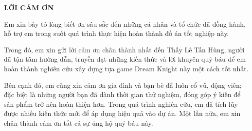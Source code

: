 \documentclass[../DoAn.tex]{subfiles}
\begin{document}
\begin{center}
    \Large{\textbf{LỜI CẢM ƠN}}\\
\end{center}
\vspace{1cm}

Em xin bày tỏ lòng biết ơn sâu sắc đến những cá nhân và tổ chức đã đồng hành, hỗ trợ em trong suốt quá trình thực hiện hoàn thành đồ án tốt nghiệp này. 

Trong đó, em xin gửi lời cảm ơn chân thành nhất đến Thầy Lê Tấn Hùng, người đã tận tâm hướng dẫn, truyền đạt những kiến thức và lời khuyên quý báu để em hoàn thành nghiên cứu xây dựng tựa game Dream Knight này một cách tốt nhất. 

Bên cạnh đó, em cũng xin cảm ơn gia đình và bạn bè đã luôn cổ vũ, động viên; đặc biệt là những người bạn đã dành thời gian thử nghiệm, đóng góp ý kiến để sản phẩm trở nên hoàn thiện hơn. Trong quá trình nghiên cứu, em đã tích lũy được nhiều kiến thức mới để áp dụng hiệu quả vào dự án. Một lần nữa, em xin chân thành cảm ơn tất cả sự ủng hộ quý báu này.
\end{document}
